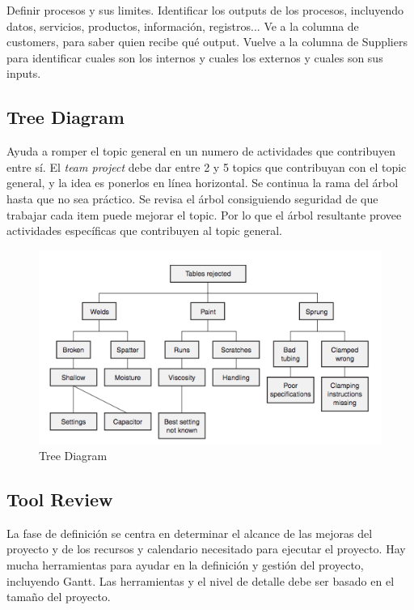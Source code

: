 \documentclass[]{article}
\begin{document}
Definir procesos y sus limites. Identificar los outputs de los procesos, incluyendo datos, servicios, productos, información, registros... Ve a la columna de customers, para saber quien recibe qué output. Vuelve a la columna de Suppliers para identificar cuales son los internos y cuales los externos y cuales son sus inputs.

\subsection{Tree Diagram}

Ayuda a romper el topic general en un numero de actividades que contribuyen entre sí. El \textit{team project} debe dar entre 2 y 5 topics que contribuyan con el topic general, y la idea es ponerlos en línea horizontal. Se continua la rama del árbol hasta que no sea práctico. Se revisa el árbol consiguiendo seguridad de que trabajar cada item puede mejorar el topic. Por lo que el árbol resultante provee actividades específicas que contribuyen al topic general.

\begin{figure}[ht!]
	\centering
	\includegraphics[width=120mm]{imagenes/TreeDiagram.png}
	\caption{Tree Diagram}
	\label{fig:TreeDiagram}
\end{figure}

\subsection{Tool Review}

La fase de definición se centra en determinar el alcance de las mejoras del proyecto y de los recursos y calendario necesitado para ejecutar el proyecto. Hay mucha herramientas para ayudar en la definición y gestión del proyecto, incluyendo Gantt. Las herramientas y el nivel de detalle debe ser basado en el tamaño del proyecto.
\end{document}
